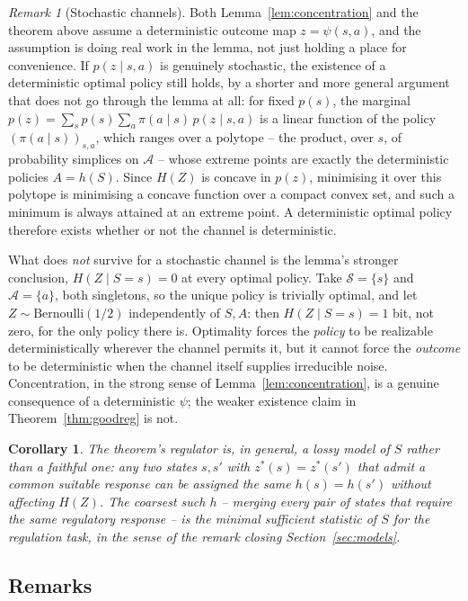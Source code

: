 \documentclass[11pt]{article}
\newtheorem{corollary}{Corollary}
\theoremstyle{definition}
\theoremstyle{remark}
\newtheorem{remark}{Remark}
\newcommand{\Scal}{\mathcal{S}}
\newcommand{\Acal}{\mathcal{A}}
\begin{document}
\begin{remark}[Stochastic channels]
\label{rem:stochastic}
Both Lemma~\ref{lem:concentration} and the theorem above assume a
deterministic outcome map $z=\psi(s,a)$, and the assumption is doing real
work in the lemma, not just holding a place for convenience. If
$p(z\mid s,a)$ is genuinely stochastic, the existence of a deterministic
optimal policy still holds, by a shorter and more general argument that
does not go through the lemma at all: for fixed $p(s)$, the marginal
$p(z)=\sum_s p(s)\sum_a \pi(a\mid s)\,p(z\mid s,a)$ is a linear function of
the policy $(\pi(a\mid s))_{s,a}$, which ranges over a polytope -- the
product, over $s$, of probability simplices on $\Acal$ -- whose extreme
points are exactly the deterministic policies $A=h(S)$. Since $H(Z)$ is
concave in $p(z)$, minimising it over this polytope is minimising a
concave function over a compact convex set, and such a minimum is always
attained at an extreme point. A deterministic optimal policy therefore
exists whether or not the channel is deterministic.

What does \emph{not} survive for a stochastic channel is the lemma's
stronger conclusion, $H(Z\mid S=s)=0$ at every optimal policy. Take
$\Scal=\{s\}$ and $\Acal=\{a\}$, both singletons, so the unique policy is
trivially optimal, and let $Z\sim\mathrm{Bernoulli}(1/2)$ independently of
$S,A$: then $H(Z\mid S=s)=1$ bit, not zero, for the only policy there is.
Optimality forces the \emph{policy} to be realizable deterministically
wherever the channel permits it, but it cannot force the \emph{outcome} to
be deterministic when the channel itself supplies irreducible noise.
Concentration, in the strong sense of Lemma~\ref{lem:concentration}, is a
genuine consequence of a deterministic $\psi$; the weaker existence claim
in Theorem~\ref{thm:goodreg} is not.
\end{remark}

\begin{corollary}
The theorem's regulator is, in general, a \emph{lossy} model of $S$ rather
than a faithful one: any two states $s,s'$ with $z^\ast(s)=z^\ast(s')$ that
admit a common suitable response can be assigned the same $h(s)=h(s')$
without affecting $H(Z)$. The coarsest such $h$ -- merging every pair of
states that require the same regulatory response -- is the minimal
sufficient statistic of $S$ for the regulation task, in the sense of the
remark closing Section~\ref{sec:models}.
\end{corollary}

\subsection*{Remarks}
\end{document}
